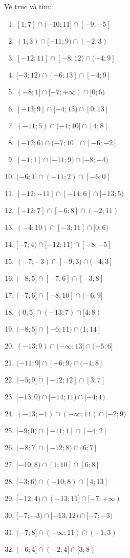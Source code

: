\documentclass[12pt,a4paper]{article}
\begin{document}
\begin{ex}
	Vẽ trục và tìm:
	\begin{enumerate}
		\item $[1;7]\cap(-10;11]\cap[-9;-5]$
		\item $(1;3)\cap[-11;9)\cap(-2;3)$
		\item $[-12;11]\cap[-8;12)\cap(-4;9]$
		\item $[-3;12)\cap[-6;13]\cap[-4;9]$
		\item $(-8;1]\cap[-7;+ \infty)\cap[0;6)$
		\item $[-13;9]\cap[-4;13)\cap[0;13]$
		\item $(-11;5)\cap(-1;10]\cap[4;8]$
		\item $[-12;6)\cap(-7;10]\cap[-6;-2]$
		\item $[-1;1]\cap[-11;9)\cap[-8;-4)$
		\item $(-6;1]\cap(-11;2)\cap[-6;0]$
		\item $[-12;-11]\cap[-14;6]\cap[-13;5)$
		\item $[-12;7]\cap[-6;8]\cap(-2;11)$
		\item $(-4;10)\cap[-3;11]\cap[0;6)$
		\item $[-7;4)\cap[-12;11)\cap[-8;-5]$
		\item $(-7;-3)\cap[-9;3)\cap(-4;3]$
		\item $(-8;5]\cap[-7;6]\cap[-3;8]$
		\item $(-7;6]\cap[-8;10]\cap(-6;9]$
		\item $(0;5]\cap(-13;7)\cap[4;8)$
		\item $(-8;5]\cap[-6;11)\cap(1;14]$
		\item $(-13;9)\cap(-\infty;13]\cap(-5;6]$
		\item $(-11;9]\cap[-6;9)\cap(-4;8]$
		\item $(-5;9]\cap[-12;12]\cap[3;7]$
		\item $[-13;0)\cap[-14;11)\cap[-4;1)$
		\item $(-13;-1)\cap(-\infty;11)\cap[-2;9)$
		\item $[-9;0)\cap[-11;1]\cap[-4;2]$
		\item $(-8;7]\cap[-12;8)\cap(6;7]$
		\item $[-10;8)\cap[1;10]\cap[6;8]$
		\item $[-3;6)\cap(-10;8)\cap[4;13]$
		\item $[-12;4)\cap(-13;11]\cap[-7;+ \infty)$
		\item $[-7;-3)\cap[-13;12)\cap[-7;-3)$
		\item $(-7;8]\cap(-\infty;11)\cap(-1;3)$
		\item $(-6;4]\cap(-2;4]\cap[3;8)$

\end{enumerate}
\end{ex}
\end{document}
